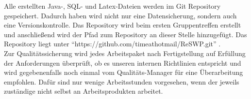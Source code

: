 Alle erstellten Java-, SQL- und Latex-Dateien werden im Git Repository gespeichert. Dadurch haben wird nicht nur eine Datensicherung, sondern auch eine Versionskontrolle. Das Repository wird beim ersten Gruppentreffen erstellt und anschließend wird der Pfad zum Repository an dieser Stelle hinzugefügt. Das Repository liegt unter "`https://github.com/timeathotmail/ReSWP.git"' .\\
Zur Qualitätssicherung wird jedes Arbeitspaket nach Fertigstellung auf Erfüllung der Anforderungen überprüft, ob es unseren internen Richtlinien entspricht und wird gegebenenfalls noch einmal vom Qualitäts-Manager für eine Überarbeitung empfohlen. Dafür sind nur wenige Arbeitsstunden vorgesehen, wenn der jeweils zuständige nicht selbst an Arbeitsprodukten arbeitet.

